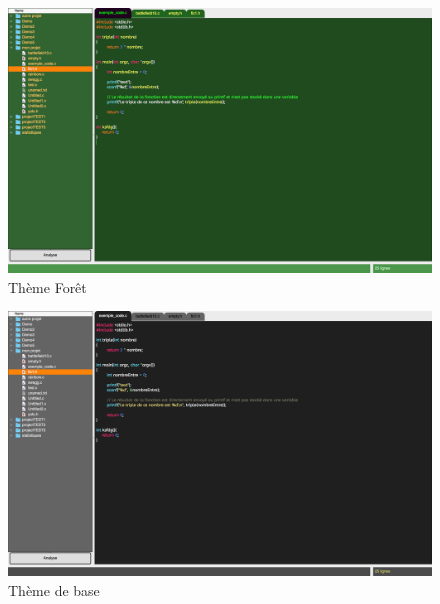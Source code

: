\documentclass[a4paper,12pt]{article}
\begin{document}
	
		\begin{figure}[h!]
			\begin{center}
				\includegraphics[scale=0.2]{images/imgs_themes/theme_forest}
				\caption{Thème Forêt}
			\end{center}
		\end{figure}
		
		\begin{figure}[h!]
			\begin{center}
				\includegraphics[scale=0.2]{images/imgs_themes/theme_basic}
				\caption{Thème de base}
			\end{center}
		\end{figure}
		
\end{document}
